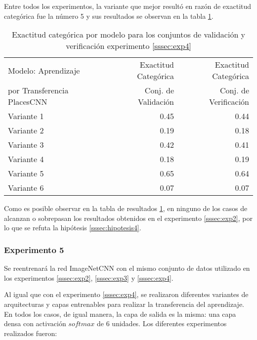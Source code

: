 Entre todos los experimentos, la variante que mejor resultó en razón de exactitud categórica fue la número 5 y sus resultados se observan en la tabla \ref{exp4:results}.


\begin{table}[h!]
	\centering
	\begin{tabular}{| l | r | r |}
		\toprule
		Modelo: Aprendizaje & Exactitud Categórica &  Exactitud Categórica \\
		por Transferencia PlacesCNN & Conj. de Validación &  Conj. de Verificación \\
		\midrule
		Variante 1 & 0.45 & 0.44 \\
		\midrule
		Variante 2 & 0.19 & 0.18 \\
		\midrule
		Variante 3 & 0.42 & 0.41 \\
		\midrule
		Variante 4 & 0.18 & 0.19 \\
		\midrule
		Variante 5 & 0.65 & 0.64 \\
		\midrule
		Variante 6 & 0.07 & 0.07 \\
		\bottomrule
	\end{tabular}
	\caption{Exactitud categórica por modelo para los conjuntos de validación y verificación experimento \ref{sssec:exp4}}
	\label{exp4:results}
\end{table}

Como es posible observar en la tabla de resultados \ref{exp4:results}, en ninguno de los casos de alcanzan o sobrepasan los resultados obtenidos en el experimento \ref{sssec:exp2}, por lo que se refuta la hipótesis \ref{sssec:hipotesis4}.

\subsubsection{Experimento 5} \label{sssec:exp5}
Se reentrenará la red ImageNetCNN con el mismo conjunto de datos utilizado en los experimentos \ref{sssec:exp2}, \ref{sssec:exp3} y \ref{sssec:exp4}.

Al igual que con el experimento \ref{sssec:exp4}, se realizaron diferentes variantes de arquitecturas y capas entrenables para realizar la transferencia del aprendizaje. En todos los casos, de igual manera, la capa de salida  es la misma: una capa densa con activación \(softmax\) de 6 unidades. Los diferentes experimentos realizados fueron:

